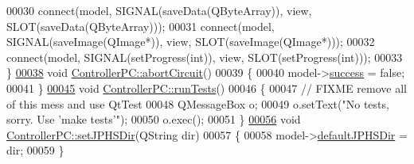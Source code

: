 \begin{DoxyCode}
00030     connect(model, SIGNAL(saveData(QByteArray)), view, SLOT(saveData(QByteArray)));
00031     connect(model, SIGNAL(saveImage(QImage*)), view, SLOT(saveImage(QImage*)));
00032     connect(model, SIGNAL(setProgress(\textcolor{keywordtype}{int})), view, SLOT(setProgress(\textcolor{keywordtype}{int})));
00033 \}
\hypertarget{controllerpc_8cpp_source.tex_l00038}{}\hyperlink{class_controller_p_c_a8814989f7be1214e06b2e720889066b0}{00038} \textcolor{keywordtype}{void} \hyperlink{class_controller_p_c_a8814989f7be1214e06b2e720889066b0}{ControllerPC::abortCircuit}()
00039 \{
00040     model->\hyperlink{class_model_p_c_a945ffbbc44a832b953c191debd448f4c}{success} = \textcolor{keyword}{false};
00041 \}
\hypertarget{controllerpc_8cpp_source.tex_l00045}{}\hyperlink{class_controller_p_c_aaa59fc90e1ef731eee4560ec87e43707}{00045} \textcolor{keywordtype}{void} \hyperlink{class_controller_p_c_aaa59fc90e1ef731eee4560ec87e43707}{ControllerPC::runTests}()
00046 \{
00047     \textcolor{comment}{// FIXME remove all of this mess and use QtTest}
00048     QMessageBox o;
00049     o.setText(\textcolor{stringliteral}{"No tests, sorry. Use 'make tests'"});
00050     o.exec();
00051 \}
\hypertarget{controllerpc_8cpp_source.tex_l00056}{}\hyperlink{class_controller_p_c_ac00d29685a7e5b780c01eb438e10f96d}{00056} \textcolor{keywordtype}{void} \hyperlink{class_controller_p_c_ac00d29685a7e5b780c01eb438e10f96d}{ControllerPC::setJPHSDir}(QString dir)
00057 \{
00058     model->\hyperlink{class_model_p_c_abd038306f14f22fb885a1697c96d6335}{defaultJPHSDir} = dir;
00059 \}
\end{DoxyCode}
